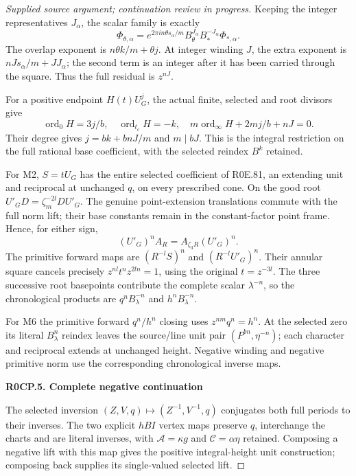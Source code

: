 \begin{proof}[Supplied source argument; continuation review in progress]
Keeping the integer representatives \(J_\alpha\), the scalar family
is exactly
\[
 \Phi_{\theta,\alpha}=e^{2\pi in\theta s_\alpha/m}
 B_\theta^{J_\alpha}B_*^{-J_\alpha}\Phi_{*,\alpha}.
\]
The overlap exponent is \(n\theta k/m+\theta j\). At integer
winding \(J\), the extra exponent is
\(nJs_\alpha/m+JJ_\alpha\); the second term is an integer after
it has been carried through the square. Thus the full residual is
\(z^{nJ}\).

For a positive endpoint \(H(t)U_G^j\), the actual finite, selected
and root divisors give
\[
 \operatorname{ord}_0H=3j/b,\quad
 \operatorname{ord}_{t_c}H=-k,\quad
 m\operatorname{ord}_\infty H+2mj/b+nJ=0.
\]
Their degree gives \(j=bk+bnJ/m\) and \(m\mid bJ\).
This is the integral restriction on the full rational base
coefficient, with the selected reindex \(B^k\) retained.

For M2, \(S=tU_G\) has the entire selected coefficient of R0E.81,
an extending unit and reciprocal at unchanged \(q\), on every
prescribed cone. On the good root
\(U'_GD=\zeta_m^{-2l}DU'_G\). The genuine point-extension
translations commute with the full norm lift; their base constants
remain in the constant-factor point frame. Hence, for either sign,
\[
 (U'_G)^nA_R=A_{\zeta_3R}(U'_G)^n.
\]
The primitive forward maps are
\((R^{-l}S)^n\) and \((R^{-l}U'_G)^n\). Their annular square
cancels precisely
\(z^{nl}t^nz^{2ln}=1\), using the original \(t=z^{-3l}\).
The three successive root basepoints contribute the complete scalar
\(\lambda^{-n}\), so the chronological products are
\(q^nB_\lambda^{-n}\) and \(h^nB_\lambda^{-n}\).

For M6 the primitive forward \(q^n/h^n\) closing uses
\(z^{nm}q^n=h^n\). At the selected zero its literal
\(B_\lambda^n\) reindex leaves the source/line unit pair
\((P^{bn},\eta^{-n})\); each character and reciprocal extends
at unchanged height. Negative winding and negative primitive norm
use the corresponding chronological inverse maps.

\par

\medskip\noindent\textbf{R0CP.5. Complete negative continuation}

\par\nobreak

The selected inversion \((Z,V,q)\mapsto(Z^{-1},V^{-1},q)\)
conjugates both full periods to their inverses. The two explicit
\(hBI\) vertex maps preserve \(q\), interchange the charts and
are literal inverses, with \(\mathcal A=\kappa g\) and
\(\mathcal C=\alpha\eta\) retained. Composing a negative lift
with this map gives the positive integral-height unit construction;
composing back supplies its single-valued selected lift.


\end{proof}
